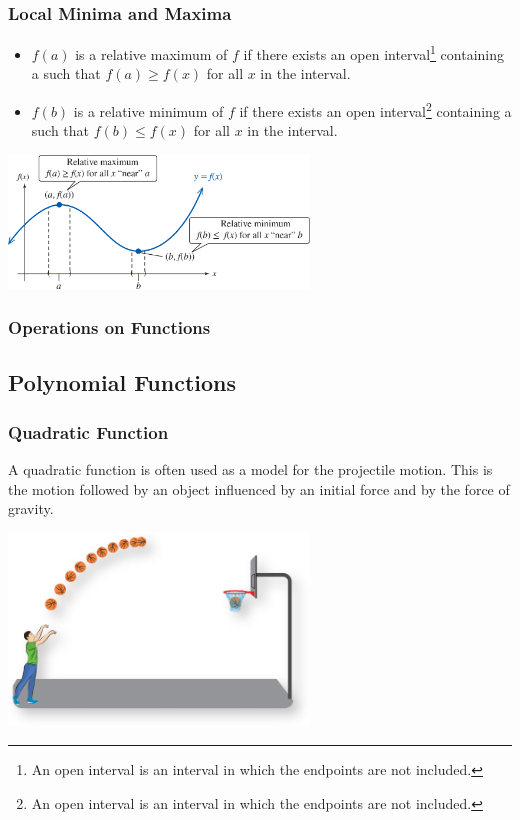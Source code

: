 \documentclass{beamer}
\begin{document}
\begin{frame}\frametitle{Local Minima and Maxima}

\begin{itemize}
\item $f(a)$ is a relative maximum of $f$ if there exists an open interval\footnote{An open interval is an interval in which the endpoints are not included.} containing a such that $f(a) \geq f(x)$ for all $x$ in the interval.
\item $f(b)$ is a relative minimum of $f$ if there exists an open interval\footnote{An open interval is an interval in which the endpoints are not included.} containing a such that $f(b) \leq f(x)$ for all $x$ in the interval.
\end{itemize}
\begin{center}
\includegraphics[width=8cm]{fig/minmax.png}
\end{center}
\end{frame}


\begin{frame}\frametitle{Operations on Functions}

\end{frame}


\subsection{Polynomial Functions}

\begin{frame}\frametitle{Quadratic Function}

A quadratic function is often used as a model for the projectile motion. This is the motion followed by an object influenced by an initial force and by the force of gravity.

\begin{center}
\includegraphics[width=8cm]{fig/basketball.png}
\end{center}

\end{frame}
\end{document}
